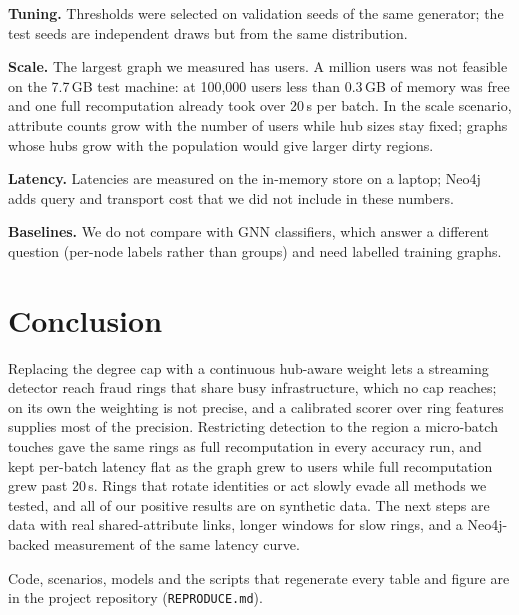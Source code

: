 \textbf{Tuning.} Thresholds were selected on validation seeds of the same
generator; the test seeds are independent draws but from the same
distribution.

\textbf{Scale.} The largest graph we measured has \ScaleMaxUsers{} users. A
million users was not feasible on the 7.7\,GB test machine: at 100{,}000 users
less than 0.3\,GB of memory was free and one full recomputation already took
over 20\,s per batch. In the scale scenario, attribute counts grow with the
number of users while hub sizes stay fixed; graphs whose hubs grow with the
population would give larger dirty regions.

\textbf{Latency.} Latencies are measured on the in-memory store on a laptop;
Neo4j adds query and transport cost that we did not include in these numbers.

\textbf{Baselines.} We do not compare with GNN classifiers, which answer a
different question (per-node labels rather than groups) and need labelled
training graphs.

\section{Conclusion}
Replacing the degree cap with a continuous hub-aware weight lets a streaming
detector reach fraud rings that share busy infrastructure, which no cap reaches;
on its own the weighting is not precise, and a calibrated scorer over ring
features supplies most of the precision. Restricting detection to the region a
micro-batch touches gave the same rings as full recomputation in every
accuracy run, and kept per-batch latency flat as the graph grew to
\ScaleMaxUsers{} users while full recomputation grew past 20\,s. Rings that
rotate identities or act slowly evade all methods we tested, and all of our
positive results are on synthetic data. The next steps are data with real
shared-attribute links, longer windows for slow rings, and a Neo4j-backed
measurement of the same latency curve.

Code, scenarios, models and the scripts that regenerate every table and figure
are in the project repository (\texttt{REPRODUCE.md}).
